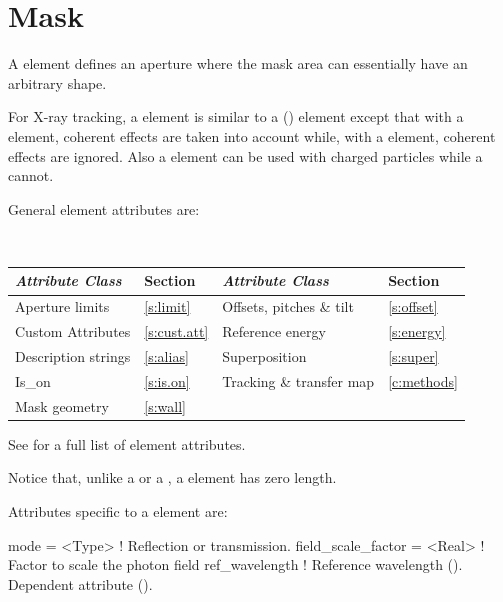 {%
\section{Mask}
\label{s:mask}

A  element defines an aperture where the mask area can
essentially have an arbitrary shape. 

For X-ray tracking, a  element is similar to a
 () element except that with
a  element, coherent effects are taken into
account while, with a  element, coherent effects are ignored.
Also a  element can be used with charged particles while a
 cannot.

General  element attributes are:
\begin{center}
\tt 
\begin{tabular}{llll} \toprule
  {\sl Attribute Class}      & Section           & {\sl Attribute Class}      & Section         \\ \midrule
  Aperture limits            & \ref{s:limit}     & Offsets, pitches \& tilt   & \ref{s:offset}  \\
  Custom Attributes          & \ref{s:cust.att}  & Reference energy           & \ref{s:energy}  \\
  Description strings        & \ref{s:alias}     & Superposition              & \ref{s:super}   \\
  Is_on                      & \ref{s:is.on}     & Tracking \& transfer map   & \ref{c:methods} \\
  Mask geometry              & \ref{s:wall}      &                            &                 \\ 
  \bottomrule
\end{tabular}
\end{center}
\toffset
See  for a full list of element attributes.

Notice that, unlike a  or a , a  element has zero length.

Attributes specific to a  element are:
\begin{example}
  mode               = <Type>   ! Reflection or transmission.
  field_scale_factor = <Real>   ! Factor to scale the photon field
  ref_wavelength                ! Reference wavelength (). Dependent attribute ().
\end{example}

}
